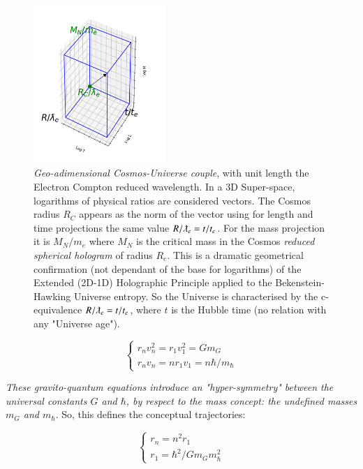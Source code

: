 \documentclass[a4paper,9pt]{article}
\begin{document}
\begin{figure}
\centering
\includegraphics[width=5cm,height=6cm]{./figure/triaxis.png}
\caption[Figure \ref{cuboid} MLT Adimensional cuboid]{\textit{Geo-adimensional Cosmos-Universe couple}, with unit length the Electron Compton reduced wavelength. In a 3D Super-space, logarithms of physical ratios are considered vectors. The Cosmos radius $ R_C$ appears as the norm of the vector using for length and time projections the same value $R/\lambdabar_e = t/t_e$. For the mass projection it is $M_N/m_e$ where $M_N$ is the critical mass in the Cosmos \textit{reduced spherical hologram} of radius $R_e$. This is a dramatic geometrical confirmation (not dependant of the base for logarithms) of the Extended (2D-1D) Holographic Principle applied to the Bekenstein-Hawking Universe entropy. So the Universe is characterised by the c-equivalence $R/\lambdabar_e = t/t_e$, where $t$ is the Hubble time (no relation with any "Universe age").} 
\label{cuboid}
\end{figure} 

 \begin{equation}\label{Eq11}
 \left\{
    \begin{array}{ll}
        r_nv_n^2 = r_1v_1^2 = Gm_G \\
        r_nv_n = nr_1v_1 = n \hbar/m_{\hbar}
    \end{array}
\right.
\end{equation}

\textit{These gravito-quantum equations introduce an "hyper-symmetry" between the universal constants $G$ and $\hbar$, by respect to the mass concept: the undefined masses $m_G$ and $m_{\hbar}$}. So, this defines the conceptual trajectories:

\begin{equation}\label{Eq12}
 \left\{
    \begin{array}{ll}
        r_n = n^2 r_1 \\
        
        r_1 = \hbar^2/Gm_Gm_{\hbar}^2   
    \end{array}
\right.
\end{equation}
\end{document}
